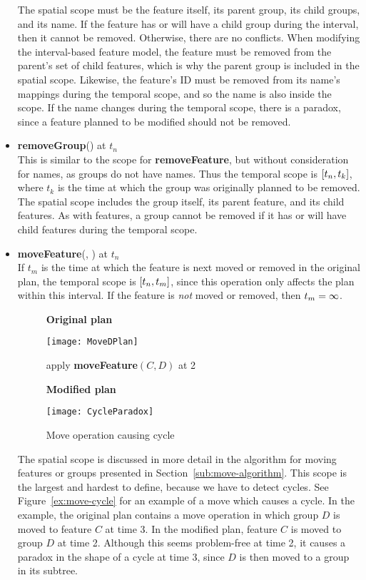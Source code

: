 \begin{itemize}
    The spatial scope must be the feature itself, its parent group, its child groups, and its name. If the feature has or will have a child group during the interval, then it cannot be removed. Otherwise, there are no conflicts. When modifying the interval-based feature model, the feature must be removed from the parent's set of child features, which is why the parent group is included in the spatial scope. Likewise, the feature's ID must be removed from its name's mappings during the temporal scope, and so the name is also inside the scope. If the name changes during the temporal scope, there is a paradox, since a feature planned to be modified should not be removed.  
  \item \textbf{removeGroup}() at $t_n$\\
    This is similar to the scope for \textbf{removeFeature}, but without consideration for names, as groups do not have names.  Thus the temporal scope is $\interval{t_n}{t_k}$, where $t_k$ is the time at which the group was originally planned to be removed. The spatial scope includes the group itself, its parent feature, and its child features. As with features, a group cannot be removed if it has or will have child features during the temporal scope.
  \item \textbf{moveFeature}(, ) at $t_n$ \\
    If $t_m$ is the time at which the feature is next moved or removed in the original plan, the temporal scope is $\interval{t_n}{t_m}$, since this operation only affects the plan within this interval. If the feature is \emph{not} moved or removed, then $t_m = \infty$.
  \begin{figure}[h]
    \centering

      \textbf{Original plan}

      \texttt{[image: MoveDPlan]}
      \bigskip

      apply \textbf{moveFeature}$(C, D)$ at 2
      \bigskip

      \textbf{Modified plan}

      \texttt{[image: CycleParadox]}
    \caption{Move operation causing cycle}
    \label{ex:move-cycle}
  \end{figure}

  The spatial scope is discussed in more detail in the algorithm for moving features or groups presented in Section~\vref{sub:move-algorithm}. This scope is the largest and hardest to define, because we have to detect cycles. See Figure~\vref{ex:move-cycle} for an example of a move which causes a cycle. In the example, the original plan contains a move operation in which group $D$ is moved to feature $C$ at time 3. In the modified plan, feature $C$ is moved to group $D$ at time 2. Although this seems problem-free at time 2, it causes a paradox in the shape of a cycle at time 3, since $D$ is then moved to a group in its subtree. 


\end{itemize}
